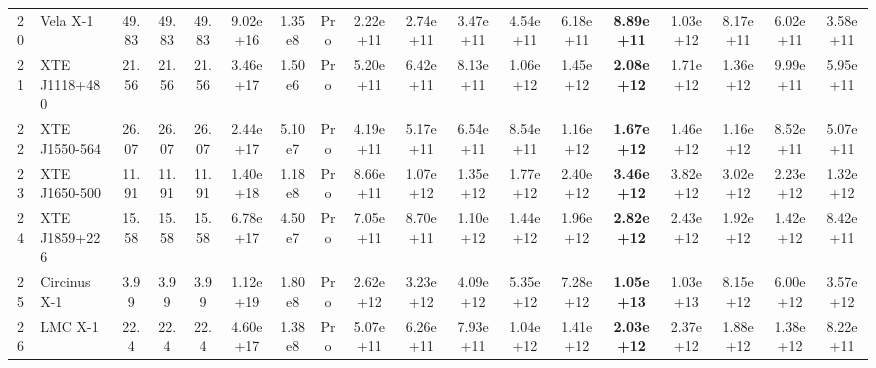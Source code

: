 \documentclass[11pt, a4paper]{article}
\begin{document}
\begin{landscape}
\begin{table}[htbp]
{\begin{tabular}{c l c c c c c c c c c c c c c c c c}
        20 & Vela X-1 & 49.83 & 49.83 & 49.83 & 9.02e+16 & 1.35e8 & Pro & 2.22e+11 & 2.74e+11 & 3.47e+11 & 4.54e+11 & 6.18e+11 & \textbf{8.89e+11} & 1.03e+12 & 8.17e+11 & 6.02e+11 & 3.58e+11 \\
        21 & XTE J1118+480 & 21.56 & 21.56 & 21.56 & 3.46e+17 & 1.50e6 & Pro & 5.20e+11 & 6.42e+11 & 8.13e+11 & 1.06e+12 & 1.45e+12 & \textbf{2.08e+12} & 1.71e+12 & 1.36e+12 & 9.99e+11 & 5.95e+11 \\
        22 & XTE J1550-564 & 26.07 & 26.07 & 26.07 & 2.44e+17 & 5.10e7 & Pro & 4.19e+11 & 5.17e+11 & 6.54e+11 & 8.54e+11 & 1.16e+12 & \textbf{1.67e+12} & 1.46e+12 & 1.16e+12 & 8.52e+11 & 5.07e+11 \\
        23 & XTE J1650-500 & 11.91 & 11.91 & 11.91 & 1.40e+18 & 1.18e8 & Pro & 8.66e+11 & 1.07e+12 & 1.35e+12 & 1.77e+12 & 2.40e+12 & \textbf{3.46e+12} & 3.82e+12 & 3.02e+12 & 2.23e+12 & 1.32e+12 \\
        24 & XTE J1859+226 & 15.58 & 15.58 & 15.58 & 6.78e+17 & 4.50e7 & Pro & 7.05e+11 & 8.70e+11 & 1.10e+12 & 1.44e+12 & 1.96e+12 & \textbf{2.82e+12} & 2.43e+12 & 1.92e+12 & 1.42e+12 & 8.42e+11 \\
        25 & Circinus X-1 & 3.99 & 3.99 & 3.99 & 1.12e+19 & 1.80e8 & Pro & 2.62e+12 & 3.23e+12 & 4.09e+12 & 5.35e+12 & 7.28e+12 & \textbf{1.05e+13} & 1.03e+13 & 8.15e+12 & 6.00e+12 & 3.57e+12 \\
        26 & LMC X-1 & 22.4 & 22.4 & 22.4 & 4.60e+17 & 1.38e8 & Pro & 5.07e+11 & 6.26e+11 & 7.93e+11 & 1.04e+12 & 1.41e+12 & \textbf{2.03e+12} & 2.37e+12 & 1.88e+12 & 1.38e+12 & 8.22e+11 \\
        \bottomrule
      \end{tabular}%
    }
  \end{table}
\end{landscape}
\end{document}
